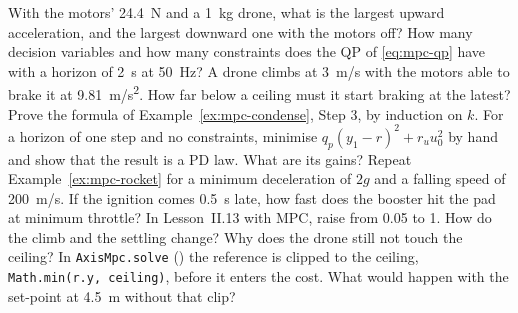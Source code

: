 \begin{exercises}
\exercise[1] With the motors' \SI{24.4}{N} and a \SI{1}{kg} drone, what is the largest upward acceleration, and the largest downward one with the motors off?
\exercise[1] How many decision variables and how many constraints does the QP of \cref{eq:mpc-qp} have with a horizon of \SI{2}{s} at \SI{50}{Hz}?
\exercise[1] A drone climbs at \SI{3}{m/s} with the motors able to brake it at \SI{9.81}{m/s^2}. How far below a ceiling must it start braking at the latest?
\exercise[2] Prove the formula of Example~\ref{ex:mpc-condense}, Step 3, by induction on $k$.
\exercise[2]\label{ex:mpc-onestep} For a horizon of one step and no constraints, minimise $q_p(y_1 - r)^2 + r_u u_0^2$ by hand and show that the result is a PD law. What are its gains?
\exercise[2] Repeat Example~\ref{ex:mpc-rocket} for a minimum deceleration of $2g$ and a falling speed of \SI{200}{m/s}. If the ignition comes \SI{0.5}{s} late, how fast does the booster hit the pad at minimum throttle?
\exercise[2] In Lesson~II.13 with MPC, raise  from 0.05 to 1. How do the climb and the settling change? Why does the drone still not touch the ceiling?
\exercise[2] In \texttt{AxisMpc.solve} () the reference is clipped to the ceiling, \texttt{Math.min(r.y, ceiling)}, before it enters the cost. What would happen with the set-point at \SI{4.5}{m} without that clip?

\end{exercises}
